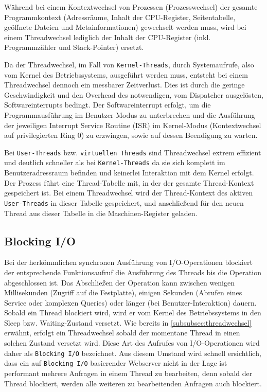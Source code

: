 Während bei einem Kontextwechsel von Prozessen (Prozesswechsel) der gesamte Programmkontext (Adressräume, Inhalt der CPU-Register,
Seitentabelle, geöffnete Dateien und Metainformationen)
gewechselt werden muss, wird bei einem Threadwechsel lediglich der Inhalt der CPU-Register (inkl. Programmzähler und Stack-Pointer)
ersetzt.\parencite{Mosberger2002}

\noindent
Da der Threadwechsel, im Fall von \verb|Kernel-Threads|, durch Systemaufrufe, also vom Kernel des Betriebssystems, ausgeführt werden muss, entsteht
bei einem Threadwechsel dennoch ein messbarer Zeitverlust.
Dies ist durch die geringe Geschwindigkeit und den Overhead des notwendigen, vom Dispatcher ausgelösten, Softwareinterrupts bedingt.
Der Softwareinterrupt erfolgt, um die Programmausführung im Benutzer-Modus zu unterbrechen und die Ausführung der jeweiligen Interrupt Service Routine (ISR) im
Kernel-Modus (Kontextwechsel auf privilegierten Ring 0) zu erzwingen, sowie auf dessen Beendigung zu warten.

Bei \verb|User-Threads| bzw. \verb|virtuellen Threads| sind Threadwechsel extrem effizient und deutlich schneller als bei \verb|Kernel-Threads|
da sie sich komplett im Benutzeradressraum befinden und keinerlei Interaktion mit dem Kernel erfolgt.
Der Prozess führt eine Thread-Tabelle mit, in der der gesamte Thread-Kontext gespeichert ist.
Bei einem Threadwechsel wird der Thread-Kontext des aktiven \verb|User-Threads| in dieser Tabelle gespeichert, und anschließend für den neuen Thread
aus dieser Tabelle in die Maschinen-Register geladen.
\parencite[Kapitel 2.2.6 Thread Scheduling]{Tanenbaum2016}
\newpage
\subsection{Blocking I/O}
\label{subsec:blocking-i/o}
Bei der herkömmlichen synchronen Ausführung von I/O-Operationen blockiert der entsprechende Funktionsaufruf die Ausführung des
Threads bis die Operation abgeschlossen ist. Das Abschließen der Operation kann zwischen wenigen Millisekunden (Zugriff auf die Festplatte),
einigen Sekunden (Abrufen eines Service oder komplexen Queries) oder länger (bei Benutzer-Interaktion) dauern.
Sobald ein Thread blockiert wird, wird er vom Kernel des Betriebssystems in den Sleep bzw. Waiting-Zustand versetzt.
Wie bereits in \ref{subsubsec:threadwechsel} erwähnt, erfolgt ein Threadwechsel sobald der momentane Thread in einen solchen Zustand
versetzt wird.
Diese Art des Aufrufes von I/O-Operationen wird daher als \verb|Blocking I/O| bezeichnet.
Aus diesem Umstand wird schnell ersichtlich, dass ein auf \verb|Blocking I/O| basierender Webserver nicht in der Lage ist
performant mehrere Anfragen in einem Thread zu bearbeiten, denn sobald der Thread blockiert, werden alle weiteren zu bearbeitenden Anfragen
auch blockiert.
